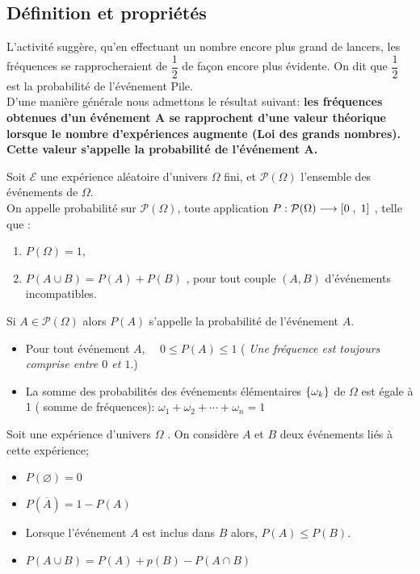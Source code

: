 \subsection*{Définition et propriétés}
L'activité suggère, qu'en effectuant un nombre encore plus grand de lancers, les fréquences se
rapprocheraient de \;$\dfrac{1}{2} $ \; de façon encore plus évidente. On dit que \; $\dfrac{1}{2} $ \; est la probabilité de l'événement Pile. \\
D'une manière générale  nous admettons le  résultat suivant: \textbf{les fréquences obtenues d’un événement A se rapprochent d’une valeur théorique lorsque le nombre d’expériences augmente (Loi des grands nombres). Cette valeur s’appelle la probabilité de l’événement A.}
\begin{definition}
Soit $ \mathcal{E} $ une expérience aléatoire d’univers $ \Omega $ fini,  et  $ \mathcal{P}(\Omega) $ l’ensemble des événements  de $ \Omega $.\\ On appelle probabilité sur $ \mathcal{P}(\Omega) $, toute application  $ P : \mathcal{P}(\Omega) \longrightarrow  \left[0\;,\; 1\right] $ , telle que :
\begin{enumerate}
\item $  P(\Omega)=1 $,
\item $ P(A\cup B)=P(A)+ P(B) $ , pour tout couple $(A, B)$  d’événements incompatibles.
\end{enumerate}
 

Si $ A\in  \mathcal{P}(\Omega) $  alors  $ P(A) $ s'appelle la probabilité de l'événement $ A. $
\end{definition}
\begin{remark}
\begin{itemize}
\item Pour tout événement  $ A $, $\quad 0\leq  P(A) \leq 1 $\; ( \textit{Une fréquence est toujours comprise entre \; $0 $ et $ 1.$})
\item La somme des probabilités  des événements élémentaires $ \left\{\omega_{k}\right\} $ de $ \Omega $  est égale à 1   ( somme  de fréquences): $ \omega _{1} +\omega _{2}+\cdots + \omega_{n} =1 $
\end{itemize}
\end{remark}
\begin{property} 
Soit une expérience d’univers $ \Omega $ . On considère  $A$ et $ B$ deux événements liés à cette expérience;
\begin{itemize}
\item $ P(\varnothing)=0 $
\item $ P(\overline{A} )=1-P(A)$
\item Lorsque l’événement  $A$ est inclus dans $B$ alors,  $P(A) \leq P(B)$.
\item $ P(A\cup B)= P(A)+ p(B)- P(A \cap B) $
\end{itemize}
\end{property}
